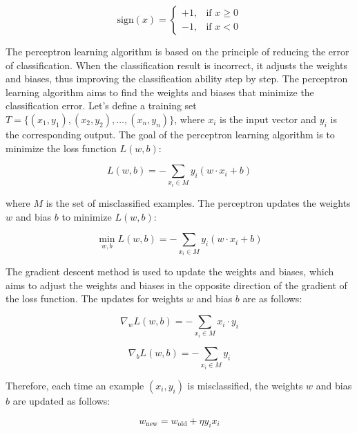 \documentclass[paper=a4, fontsize=11pt]{scrartcl} %
\numberwithin{equation}{section} %
\numberwithin{figure}{section} %
\numberwithin{table}{section} %
\begin{document}
\begin{equation}
    \text{sign}(x) = 
\begin{cases}
+1, & \text{if } x \geq 0 \\
-1, & \text{if } x < 0
\end{cases}
\end{equation}


The perceptron learning algorithm is based on the principle of reducing the error of classification. When the classification result is incorrect, it adjusts the weights and biases, thus improving the classification ability step by step. The perceptron learning algorithm aims to find the weights and biases that minimize the classification error. Let's define a training set \( T = \{(x_1, y_1), (x_2, y_2), \ldots, (x_n, y_n)\} \), where \( x_i \) is the input vector and \( y_i \) is the corresponding output. The goal of the perceptron learning algorithm is to minimize the loss function \( L(w,b) \):

\begin{equation}
L(w,b) = - \sum_{x_i \in M} y_i (w \cdot x_i + b)
\end{equation}

where \( M \) is the set of misclassified examples. The perceptron updates the weights \( w \) and bias \( b \) to minimize \( L(w,b) \):

\begin{equation}
\min_{w,b} L(w,b) = - \sum_{x_i \in M} y_i (w \cdot x_i + b)
\end{equation}

The gradient descent method is used to update the weights and biases, which aims to adjust the weights and biases in the opposite direction of the gradient of the loss function. The updates for weights \( w \) and bias \( b \) are as follows:

\begin{equation}
\nabla_w L(w,b) = - \sum_{x_i \in M} x_i \cdot y_i
\end{equation}

\begin{equation}
\nabla_b L(w,b) = - \sum_{x_i \in M} y_i
\end{equation}

Therefore, each time an example \( (x_i, y_i) \) is misclassified, the weights \( w \) and bias \( b \) are updated as follows:

\begin{equation}
w_{\text{new}} = w_{\text{old}} + \eta y_i x_i
\end{equation}
\end{document}
